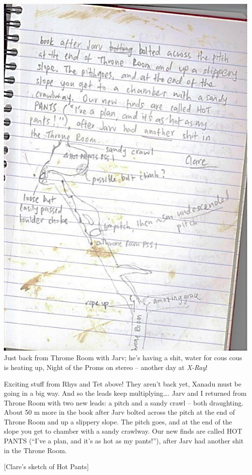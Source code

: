 \includegraphics{UgLog1012/68.jpeg}Just back from Throme Room with Jarv;
he's having a shit, water for cous cous is heating up, Night of the
Proms on stereo -- another day at \emph{X-Ray}!

Exciting stuff from Rhys and Tet above! They aren't back yet, Xanadu
must be going in a big way. And so the leads keep multiplying\ldots{}.
Jarv and I returned from Throne Room with two new leads: a pitch and a
sandy crawl -- both draughting. About 50 m more in the book after Jarv
bolted across the pitch at the end of Throne Room and up a slippery
slope. The pitch goes, and at the end of the slope you get to chamber
with a sandy crawlway. Our new finds are called HOT PANTS (``I've a
plan, and it's as hot as my pants!''), after Jarv had another shit in
the Throne Room.

{[}Clare's sketch of Hot Pants{]}

